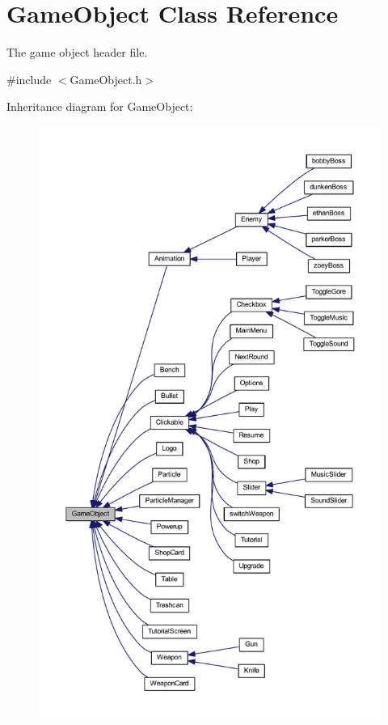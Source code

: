 \hypertarget{class_game_object}{\section{Game\+Object Class Reference}
\label{class_game_object}
}


The game object header file.  




{\ttfamily \#include $<$Game\+Object.\+h$>$}



Inheritance diagram for Game\+Object\+:
\nopagebreak
\begin{figure}[H]
\begin{center}
\leavevmode
\includegraphics[height=550pt]{class_game_object__inherit__graph}
\end{center}
\end{figure}
